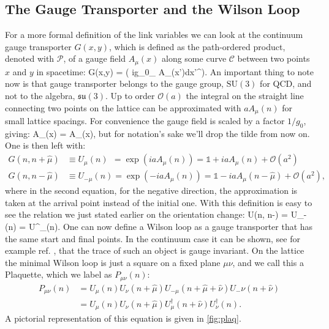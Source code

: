 \subsection{The Gauge Transporter and the Wilson Loop}
For a more formal definition of the link variables we can look at the continuum gauge transporter $G(x,y)$, which is defined as the path-ordered product, denoted with $\mathcal{P}$, of a gauge field $A_\mu(x)$ along some curve $\mathcal{C}$ between two points $x$ and $y$ in spacetime:
\beq
    G(x,y) =  \exp\left( ig_0\int_ A_\mu(x')dx'^\mu  \right).
\eeq
An important thing to note now is that gauge transporter belongs to the gauge group, $\mathrm{SU}(3)$ for QCD, and not to the algebra, $\mathfrak{su}(3)$. 
Up to order $\mathcal{O}(a)$ the integral on the straight line connecting two points on the lattice can be approximated with $aA_\mu(n)$ for small lattice spacings. For convenience the gauge field is scaled by a factor $1/g_0$, giving: 
\beq
\tilde A_\mu(x) =  A_\mu(x),
\label{eq:fieldscale}
\eeq
but for notation's sake we'll drop the tilde from now on. One is then left with:
\begin{align}
    G(n,n+\hat\mu) &\equiv U_\mu(n) ~~= \exp(iaA_\mu(n)) = \mathds{1} + iaA_\mu(n) + \mathcal{O}(a^2) \label{eq:transporter}\\\nonumber
    G(n,n-\hat\mu) &\equiv U_{-\mu}(n) = \exp(-iaA_\mu(n)) = \mathds{1} - iaA_\mu(n-\hat\mu) + \mathcal{O}(a^2),
\end{align}
where in the second equation, for the negative direction, the approximation is taken at the arrival point instead of the initial one. With this definition is easy to see the relation we just stated earlier on the orientation change:
\beq
    U(n, n-\hat\mu) = U_{-\mu}(n) = U^\dagger_\mu(n).
\eeq
One can now define a Wilson loop as a gauge transporter that has the same start and final points. In the continuum case it can be shown, see for example ref. \cite{peskin}, that the trace of such an object is gauge invariant. On the lattice the minimal Wilson loop is just a square on a fixed plane $\mu\nu$, and we call this a Plaquette, which we label as $P_{\mu\nu}(n)$:
\begin{align}
    \label{plaquette}
P_{\mu\nu}(n) &= U_\mu(n) U_\nu(n+\hat\mu) U_{-\mu}(n+\hat\mu+\hat\nu) U_-{\nu}(n+\hat\nu)  \\\nonumber
              &= U_\mu(n) U_\nu(n+\hat\mu) U^\dagger_\mu(n+\hat\nu) U^\dagger_\nu(n).
\end{align}
A pictorial representation of this equation is given in \cref{fig:plaq}.
